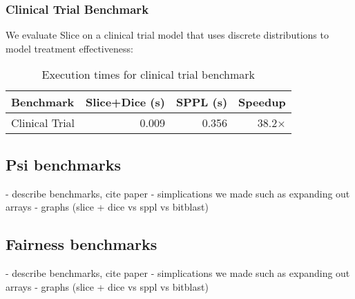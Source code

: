 \subsubsection{Clinical Trial Benchmark}
We evaluate Slice on a clinical trial model that uses discrete distributions to model treatment effectiveness:

\begin{table}[!t]
\centering
\begin{tabular}{lrrr}
\toprule
Benchmark & Slice+Dice (s) & SPPL (s) & Speedup \\
\midrule
Clinical Trial & 0.009 & 0.356 & 38.2× \\
\bottomrule
\end{tabular}
\caption{Execution times for clinical trial benchmark}
\end{table}


\subsection{Psi benchmarks}\label{sec:psi-benchmarks}
- describe benchmarks, cite paper
- simplications we made such as expanding out arrays
- graphs (slice + dice vs sppl vs bitblast)


\subsection{Fairness benchmarks}\label{sec:fairness-benchmarks}
- describe benchmarks, cite paper
- simplications we made such as expanding out arrays
- graphs (slice + dice vs sppl vs bitblast)

